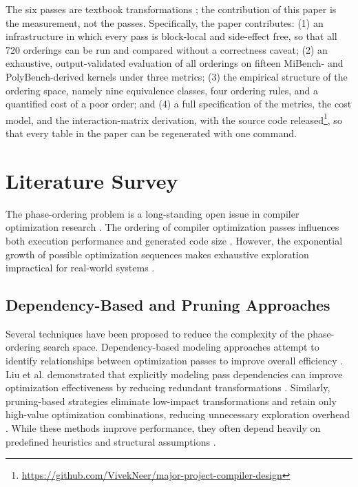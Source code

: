 \documentclass[conference]{IEEEtran}
\begin{document}
The six passes are textbook transformations \cite{ref18,ref21}; the contribution of this paper is the measurement, not the passes. Specifically, the paper contributes: (1) an infrastructure in which every pass is block-local and side-effect free, so that all 720 orderings can be run and compared without a correctness caveat; (2) an exhaustive, output-validated evaluation of all orderings on fifteen MiBench- and PolyBench-derived kernels under three metrics; (3) the empirical structure of the ordering space, namely nine equivalence classes, four ordering rules, and a quantified cost of a poor order; and (4) a full specification of the metrics, the cost model, and the interaction-matrix derivation, with the source code released\footnote{\url{https://github.com/VivekNeer/major-project-compiler-design}}, so that every table in the paper can be regenerated with one command.


\section{Literature Survey}

The phase-ordering problem is a long-standing open issue in compiler optimization research \cite{ref1}. The ordering of compiler optimization passes influences both execution performance and generated code size \cite{ref2}. However, the exponential growth of possible optimization sequences makes exhaustive exploration impractical for real-world systems \cite{ref19}.

\subsection{Dependency-Based and Pruning Approaches}
Several techniques have been proposed to reduce the complexity of the phase-ordering search space. Dependency-based modeling approaches attempt to identify relationships between optimization passes to improve overall efficiency \cite{ref1}. Liu et al. demonstrated that explicitly modeling pass dependencies can improve optimization effectiveness by reducing redundant transformations \cite{ref1}. Similarly, pruning-based strategies eliminate low-impact transformations and retain only high-value optimization combinations, reducing unnecessary exploration overhead \cite{ref4}. While these methods improve performance, they often depend heavily on predefined heuristics and structural assumptions \cite{ref19}.
\end{document}
